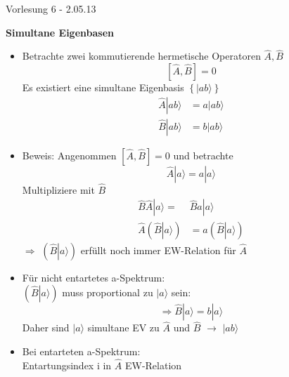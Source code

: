 \documentclass[10pt,article,colorback,accentcolor=tud9d]{scrartcl}
\begin{document}
\begin{fleqn}
\begin{flushright}
Vorlesung 6 - 2.05.13
\end{flushright}
\textbf{Simultane Eigenbasen}
  \begin{itemize}
    \item Betrachte zwei kommutierende hermetische Operatoren $\hat{A},\hat{B}$
      \begin{equation}
        \left[\hat{A},\hat{B}\right]=0
      \end{equation}
      Es existiert eine simultane Eigenbasis $\left\{\left.\right|ab\rangle\right\}$
      \begin{equation}
      \begin{aligned}
      \hat{A}\left.\right|ab\rangle&=a\left.\right|ab\rangle\\
      \hat{B}\left.\right|ab\rangle&=b\left.\right|ab\rangle
      \end{aligned}
      \end{equation}
    \item Beweis: Angenommen $\left[\hat{A},\hat{B}\right]=0$ und betrachte 
      \begin{equation}
      \hat{A}\left.\right|a\rangle=a\left.\right|a\rangle
      \end{equation}
      Multipliziere mit $\hat{B}$
      \begin{equation}
      \begin{aligned}
      \hat{B}\hat{A}\left.\right|a\rangle=&\hat{B}a\left.\right|a\rangle\\
      \hat{A}\left(\hat{B}\left.\right|a\rangle\right)&=a\left(\hat{B}\left.\right|a\rangle\right)
      \end{aligned}
      \end{equation}
        $\Rightarrow$ $\left(\hat{B}\left.\right|a\rangle\right)$ erfüllt noch immer EW-Relation für $\hat{A}$
    \item Für nicht entartetes a-Spektrum:\\
      $\left(\hat{B}\left.\right|a\rangle\right)$ muss proportional zu $\left.\right|a\rangle$ sein:
      \begin{equation}
      \Rightarrow \hat{B}\left.\right|a\rangle=b\left.\right|a\rangle
      \end{equation}
      Daher sind $\left.\right|a\rangle$ simultane EV zu $\hat{A}$ und $\hat{B}$ $\rightarrow$ $\left.\right|ab\rangle$
    \item Bei entarteten a-Spektrum:\\
      Entartungsindex i in $\hat{A}$ EW-Relation

\end{itemize}
\end{fleqn}
\end{document}
